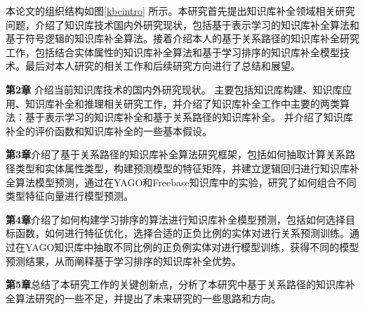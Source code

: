 本论文的组织结构如图\ref{kbcintro} 所示。本研究首先提出知识库补全领域相关研究问题，介绍了知识库技术国内外研究现状，包括基于表示学习的知识库补全算法和基于符号逻辑的知识库补全算法。接着介绍本人的基于关系路径的知识库补全研究工作，包括结合实体属性的知识库补全算法和基于学习排序的知识库补全模型技术。最后对本人研究的相关工作和后续研究方向进行了总结和展望。

\textbf{第2章} 介绍当前知识库技术的国内外研究现状。
主要包括知识库构建、知识库应用、知识库补全和推理相关研究工作，并介绍了知识库补全工作中主要的两类算法：基于表示学习的知识库补全和基于关系路径的知识库补全。
并介绍了知识库补全的评价函数和知识库补全的一些基本假设。

\textbf{第3章}介绍了基于关系路径的知识库补全算法研究框架，包括如何抽取计算关系路径类型和实体属性类型，构建预测模型的特征矩阵，并建立逻辑回归进行知识库补全算法模型预测，通过在YAGO和Freebase知识库中的实验，研究了如何组合不同类型特征向量进行模型预测。

\textbf{第4章}介绍了如何构建学习排序的算法进行知识库补全模型预测，包括如何选择目标函数，如何进行特征优化，选择合适的正负比例的实体对进行关系预测训练。通过在YAGO知识库中抽取不同比例的正负例实体对进行模型训练，获得不同的模型预测结果，从而阐释基于学习排序的知识库补全优势。

\textbf{第5章}总结了本研究工作的关键创新点，分析了本研究中基于关系路径的知识库补全算法研究的一些不足，并提出了未来研究的一些思路和方向。
